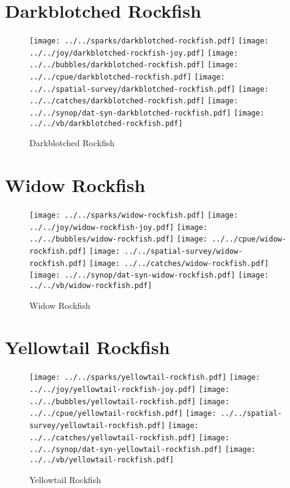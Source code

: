 \section{Darkblotched Rockfish}

\begin{figure}[htbp]
\centering
\texttt{[image: ../../sparks/darkblotched-rockfish.pdf]}
\texttt{[image: ../../joy/darkblotched-rockfish-joy.pdf]}
\texttt{[image: ../../bubbles/darkblotched-rockfish.pdf]}
\texttt{[image: ../../cpue/darkblotched-rockfish.pdf]}
\texttt{[image: ../../spatial-survey/darkblotched-rockfish.pdf]}
\texttt{[image: ../../catches/darkblotched-rockfish.pdf]}
\texttt{[image: ../../synop/dat-syn-darkblotched-rockfish.pdf]}
\texttt{[image: ../../vb/darkblotched-rockfish.pdf]}
\caption{Darkblotched Rockfish}
\end{figure}
\clearpage
\section{Widow Rockfish}

\begin{figure}[htbp]
\centering
\texttt{[image: ../../sparks/widow-rockfish.pdf]}
\texttt{[image: ../../joy/widow-rockfish-joy.pdf]}
\texttt{[image: ../../bubbles/widow-rockfish.pdf]}
\texttt{[image: ../../cpue/widow-rockfish.pdf]}
\texttt{[image: ../../spatial-survey/widow-rockfish.pdf]}
\texttt{[image: ../../catches/widow-rockfish.pdf]}
\texttt{[image: ../../synop/dat-syn-widow-rockfish.pdf]}
\texttt{[image: ../../vb/widow-rockfish.pdf]}
\caption{Widow Rockfish}
\end{figure}
\clearpage
\section{Yellowtail Rockfish}

\begin{figure}[htbp]
\centering
\texttt{[image: ../../sparks/yellowtail-rockfish.pdf]}
\texttt{[image: ../../joy/yellowtail-rockfish-joy.pdf]}
\texttt{[image: ../../bubbles/yellowtail-rockfish.pdf]}
\texttt{[image: ../../cpue/yellowtail-rockfish.pdf]}
\texttt{[image: ../../spatial-survey/yellowtail-rockfish.pdf]}
\texttt{[image: ../../catches/yellowtail-rockfish.pdf]}
\texttt{[image: ../../synop/dat-syn-yellowtail-rockfish.pdf]}
\texttt{[image: ../../vb/yellowtail-rockfish.pdf]}
\caption{Yellowtail Rockfish}
\end{figure}
\clearpage
